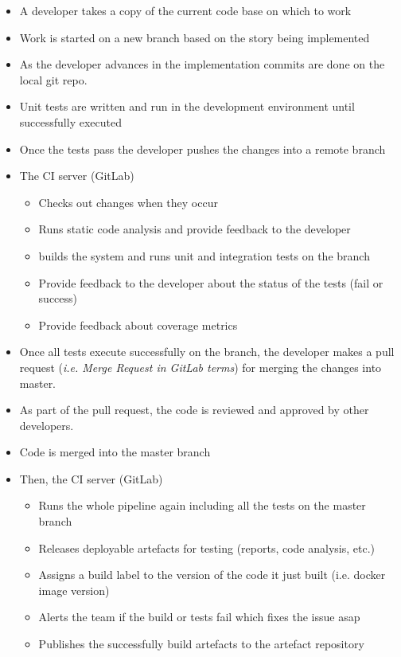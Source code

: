 \documentclass[a4paper]{spie}  %
\begin{document}
\begin{itemize}
    \item A developer takes a copy of the current code base on which to work
    \item Work is started on a new branch based on the story being implemented
    \item As the developer advances in the implementation commits are done on the local git repo.
    \item Unit tests are written and run in the development environment until successfully executed
    \item Once the tests pass the developer pushes the changes into a remote branch
    \item The CI server (GitLab)
    \begin{itemize}
        \item Checks out changes when they occur
        \item Runs static code analysis and provide feedback to the developer
        \item builds the system and runs unit and integration tests on the branch
        \item Provide feedback to the developer about the status of the tests (fail or success)
        \item Provide feedback about coverage metrics
    \end{itemize}
    \item Once all tests execute successfully on the branch, the developer makes a pull request (\textit{i.e. Merge Request in GitLab terms}) for merging the changes into master.
    \item As part of the pull request, the code is reviewed and approved by other developers.
    \item Code is merged into the master branch
    \item Then, the CI server (GitLab)
    \begin{itemize}
        \item Runs the whole pipeline again including all the tests on the master branch
        \item Releases deployable artefacts for testing (reports, code analysis, etc.)
        \item Assigns a build label to the version of the code it just built (i.e. docker image version)
        \item Alerts the team if the build or tests fail which fixes the issue asap
        \item Publishes the successfully build artefacts to the artefact repository
    \end{itemize}
\end{itemize}
\end{document}
